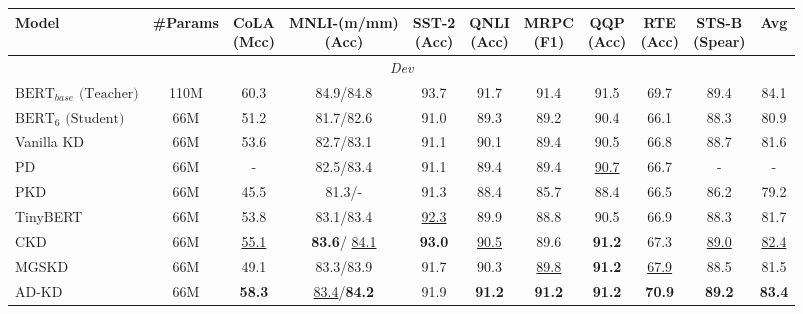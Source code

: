 \documentclass[11pt]{article}
\begin{document}
\begin{table}[t]
        
	\begin{adjustbox}{width=0.78\width,center}
	\begin{tabular}{l|c|cccccccc| >{\columncolor{mygray}} c} 
		\toprule
		Model & \#Params & \makecell[c]{CoLA\\(Mcc)} &\makecell[c]{MNLI-(m/mm)\\(Acc)} &\makecell[c]{SST-2\\(Acc)} &\makecell[c]{QNLI\\(Acc)} &\makecell[c]{MRPC\\(F1)} &\makecell[c]{QQP\\(Acc)} &\makecell[c]{RTE\\(Acc)} &\makecell[c]{STS-B\\(Spear)} &Avg\\ 
		\hline
		\multicolumn{11}{c}{\textit{Dev}} \\
            \hline
		$\text{BERT}_{base}\text{ (Teacher)}$ &110M &60.3 &84.9/84.8 &93.7 &91.7 &91.4 &91.5 &69.7 &89.4 &84.1 \\
            $\text{BERT}_{6}\text{ (Student)}$ &66M &51.2 &81.7/82.6 &91.0 &89.3 &89.2 &90.4 &66.1 &88.3 &80.9 \\
            \hline
            Vanilla KD \cite{hinton2015distilling} &66M &53.6 &82.7/83.1 &91.1 &90.1 &89.4 &90.5 &66.8 &88.7 &81.6 \\
            PD \citep{turc2019well} &66M &- &82.5/83.4 &91.1 &89.4 &89.4 &\underline{90.7} &66.7 &- &- \\
            PKD \citep{sun-etal-2019-patient} &66M &45.5 &81.3/- &91.3 &88.4 &85.7 &88.4 &66.5 &86.2 &79.2 \\
            TinyBERT \citep{jiao-etal-2020-tinybert} &66M &53.8 &83.1/83.4 &\underline{92.3} &89.9 &88.8 &90.5 &66.9 &88.3 &81.7 \\
            CKD \citep{park-etal-2021-distilling} &66M &\underline{55.1} &\textbf{83.6}/ \underline{84.1} &\textbf{93.0} &\underline{90.5} &89.6 &\textbf{91.2} &67.3 &\underline{89.0} &\underline{82.4} \\
            MGSKD \citep{liu-etal-2022-multi-granularity} &66M &49.1 &83.3/83.9 &91.7 &90.3 &\underline{89.8} &\textbf{91.2} &\underline{67.9} &88.5 &81.5 \\
            \rowcolor{mygray} AD-KD &66M &\textbf{58.3} &\underline{83.4}/\textbf{84.2} &91.9 &\textbf{91.2} &\textbf{91.2} &\textbf{91.2} &\textbf{70.9} &\textbf{89.2} &\textbf{83.4} \\

\end{tabular}
\end{adjustbox}
\end{table}
\end{document}
